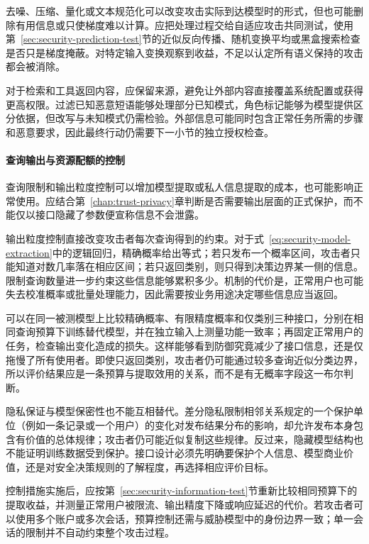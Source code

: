 去噪、压缩、量化或文本规范化可以改变攻击实际到达模型时的形式，但也可能删除有用信息或只使梯度难以计算。应把处理过程交给自适应攻击共同测试，使用第~\ref{sec:security-prediction-test}节的近似反向传播、随机变换平均或黑盒搜索检查是否只是梯度掩蔽。对特定输入变换观察到收益，不足以认定所有语义保持的攻击都会被消除。

对于检索和工具返回内容，应保留来源，避免让外部内容直接覆盖系统配置或获得更高权限。过滤已知恶意短语能够处理部分已知模式，角色标记能够为模型提供区分依据，但改写与未知模式仍需检验。外部信息可能同时包含正常任务所需的步骤和恶意要求，因此最终行动仍需要下一小节的独立授权检查。

\paragraph{查询输出与资源配额的控制}

查询限制和输出粒度控制可以增加模型提取或私人信息提取的成本，也可能影响正常使用。应结合第~\ref{chap:trust-privacy}章判断是否需要输出层面的正式保护，而不能仅以接口隐藏了参数便宣称信息不会泄露。

输出粒度控制直接改变攻击者每次查询得到的约束。对于式~\eqref{eq:security-model-extraction}中的逻辑回归，精确概率给出等式；若只发布一个概率区间，攻击者只能知道对数几率落在相应区间；若只返回类别，则只得到决策边界某一侧的信息。限制查询数量进一步约束这些信息能够累积多少。机制的代价是，正常用户也可能失去校准概率或批量处理能力，因此需要按业务用途决定哪些信息应当返回。

可以在同一被测模型上比较精确概率、有限精度概率和仅类别三种接口，分别在相同查询预算下训练替代模型，并在独立输入上测量功能一致率；再固定正常用户的任务，检查输出变化造成的损失。这样能够看到防御究竟减少了接口信息，还是仅拖慢了所有使用者。即使只返回类别，攻击者仍可能通过较多查询近似分类边界，所以评价结果应是一条预算与提取效用的关系，而不是有无概率字段这一布尔判断。

隐私保证与模型保密性也不能互相替代。差分隐私限制相邻关系规定的一个保护单位（例如一条记录或一个用户）的变化对发布结果分布的影响，却允许发布本身包含有价值的总体规律；攻击者仍可能近似复制这些规律。反过来，隐藏模型结构也不能证明训练数据受到保护。接口设计必须先明确要保护个人信息、模型商业价值，还是对安全决策规则的了解程度，再选择相应评价目标。

控制措施实施后，应按第~\ref{sec:security-information-test}节重新比较相同预算下的提取收益，并测量正常用户被限流、输出精度下降或响应延迟的代价。若攻击者可以使用多个账户或多次会话，预算控制还需与威胁模型中的身份边界一致；单一会话的限制并不自动约束整个攻击过程。

